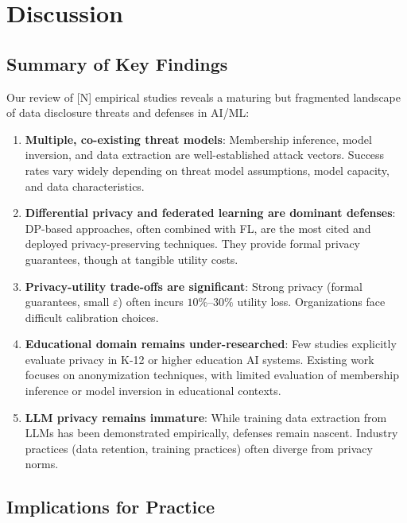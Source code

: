 \documentclass[11pt,a4paper]{article}
\begin{document}
\section{Discussion}

\subsection{Summary of Key Findings}

Our review of [N] empirical studies reveals a maturing but fragmented landscape of data disclosure threats and defenses in AI/ML:

\begin{enumerate}
\item \textbf{Multiple, co-existing threat models}: Membership inference, model inversion, and data extraction are well-established attack vectors. Success rates vary widely depending on threat model assumptions, model capacity, and data characteristics.

\item \textbf{Differential privacy and federated learning are dominant defenses}: DP-based approaches, often combined with FL, are the most cited and deployed privacy-preserving techniques. They provide formal privacy guarantees, though at tangible utility costs.

\item \textbf{Privacy-utility trade-offs are significant}: Strong privacy (formal guarantees, small $\varepsilon$) often incurs $10\%$–$30\%$ utility loss. Organizations face difficult calibration choices.

\item \textbf{Educational domain remains under-researched}: Few studies explicitly evaluate privacy in K-12 or higher education AI systems. Existing work focuses on anonymization techniques, with limited evaluation of membership inference or model inversion in educational contexts.

\item \textbf{LLM privacy remains immature}: While training data extraction from LLMs has been demonstrated empirically, defenses remain nascent. Industry practices (data retention, training practices) often diverge from privacy norms.
\end{enumerate}

\subsection{Implications for Practice}
\end{document}
